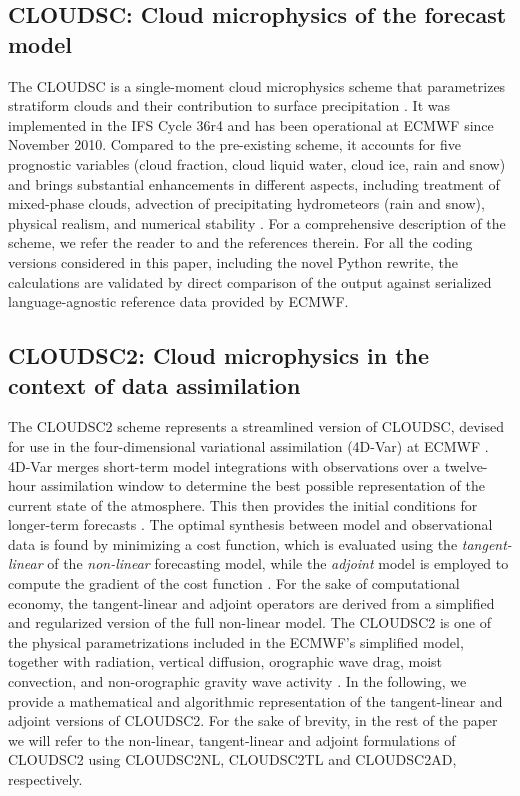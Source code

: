 \documentclass[gmd,manuscript,online]{copernicus}
\theoremstyle{theorem}
\theoremstyle{definition}
\theoremstyle{remark}
\theoremstyle{proposition}
\begin{document}
	\subsection{CLOUDSC: Cloud microphysics of the forecast model}

	The CLOUDSC is a single-moment cloud microphysics scheme that parametrizes stratiform clouds and their contribution to surface precipitation \citep{ifs48r1}. It was implemented in the IFS Cycle 36r4 and has been operational at ECMWF since November 2010. Compared to the pre-existing scheme, it accounts for five prognostic variables (cloud fraction, cloud liquid water, cloud ice, rain and snow) and brings substantial enhancements in different aspects, including treatment of mixed-phase clouds, advection of precipitating hydrometeors (rain and snow), physical realism, and numerical stability \citep{nogherotto16}. For a comprehensive description of the scheme, we refer the reader to \citet{forbes11b} and the references therein. For all the coding versions considered in this paper, including the novel Python rewrite, the calculations are validated by direct comparison of the output against serialized language-agnostic reference data provided by ECMWF.

	\subsection{CLOUDSC2: Cloud microphysics in the context of data assimilation}
	\label{section:cloudsc2}

	The CLOUDSC2 scheme represents a streamlined version of CLOUDSC, devised for use in the four-dimensional variational assimilation (4D-Var) at ECMWF \citep{courtier94}. 4D-Var merges short-term model integrations with observations over a twelve-hour assimilation window to determine the best possible representation of the current state of the atmosphere. This then provides the initial conditions for longer-term forecasts \citep{janiskova23}. The optimal synthesis between model and observational data is found by minimizing a cost function, which is evaluated using the \emph{tangent-linear} of the \emph{non-linear} forecasting model, while the \emph{adjoint} model is employed to compute the gradient of the cost function \citep{errico97, janiskova99}. For the sake of computational economy, the tangent-linear and adjoint operators are derived from a simplified and regularized version of the full non-linear model. The CLOUDSC2 is one of the physical parametrizations included in the ECMWF's simplified model, together with radiation, vertical diffusion, orographic wave drag, moist convection, and non-orographic gravity wave activity \citep{janiskova23}. In the following, we provide a mathematical and algorithmic representation of the tangent-linear and adjoint versions of CLOUDSC2. For the sake of brevity, in the rest of the paper we will refer to the non-linear, tangent-linear and adjoint formulations of CLOUDSC2 using CLOUDSC2NL, CLOUDSC2TL and CLOUDSC2AD, respectively.
\end{document}
